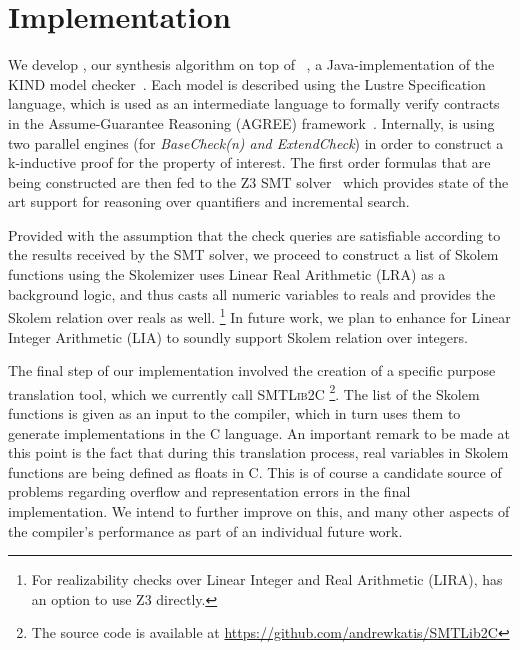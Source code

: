 \section{Implementation}
\label{sec:impl}

We develop \jkindsynt, our synthesis algorithm on top of \jkind~\cite{jkind},
a Java-implementation of the \textsc{KIND} model
checker~\cite{Hagen08:kind}. Each model is described using the Lustre
Specification language, which is used as an intermediate language to formally verify contracts in the
Assume-Guarantee Reasoning (\textsc{AGREE}) framework~\cite{NFM2012:CoGaMiWhLaLu}.
Internally, \jkind is using two parallel engines (for \textit{BaseCheck(n) and
\textit{ExtendCheck}}) in order to construct a k-inductive proof for the
property of interest.
The first order formulas that are being constructed are then fed to the \textsc{Z3} SMT
solver~\cite{DeMoura08:z3} which provides state of the art support for reasoning
over quantifiers and incremental search.

Provided with the assumption that the check queries are satisfiable according to
the results received by the SMT solver, we proceed to construct a list of
Skolem functions using the \aeval Skolemizer%
\aeval  uses Linear Real Arithmetic (LRA) as a background logic, and thus casts all numeric variables to reals and provides the Skolem relation over reals as well.%
\footnote{For realizability checks over Linear Integer and Real
  Arithmetic (LIRA), \jkind has an option to use \textsc{Z3} directly.}
In future work, we plan to enhance  \aeval for Linear Integer Arithmetic (LIA) to soundly support Skolem relation over integers.

The final step of our implementation involved the creation of a specific purpose
translation tool, which we currently call \textsc{SMTLib2C}%
\footnote{The source code
is available at \url{https://github.com/andrewkatis/SMTLib2C}}. The list
of the Skolem functions is given as an input to the compiler, which in turn uses
them to generate implementations in the C language. An important remark to be
made at this point is the fact that during this translation process, real
variables in Skolem functions are being defined as floats in C. This is of
course a candidate source of problems regarding overflow and representation
errors in the final implementation. We intend to further improve on this, and
many other aspects of the compiler's performance as part of an individual
future work.



